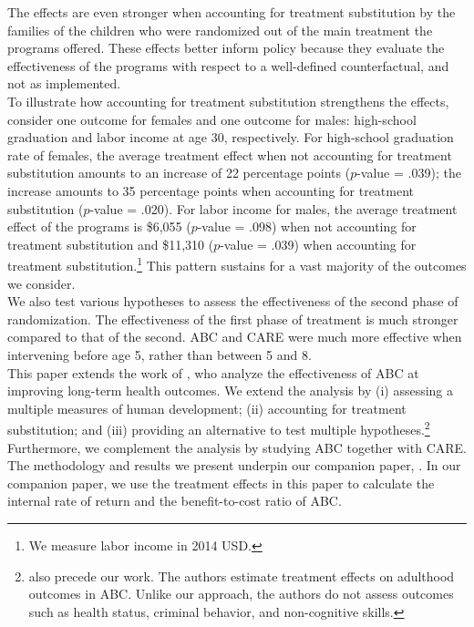 \noindent The effects are even stronger when accounting for treatment substitution by the families of the children who were randomized out of the main treatment  the programs offered. These effects better inform policy because they evaluate the effectiveness of the programs with respect to a well-defined counterfactual, and not as implemented.\\ 

\noindent To illustrate how accounting for treatment substitution strengthens the effects, consider one outcome for females and one outcome for males: high-school graduation and labor income at age 30, respectively. For high-school graduation rate of females, the average treatment effect when not accounting for treatment substitution amounts to an increase of 22 percentage points ($p$-value = .039); the increase amounts to 35 percentage points when accounting for treatment substitution ($p$-value = .020). For labor income for males, the average treatment effect of the programs is \$6,055 ($p$-value = .098) when not accounting for treatment substitution and \$11,310 ($p$-value = .039) when accounting for treatment substitution.\footnote{We measure labor income in 2014 USD.} This pattern sustains for a vast majority of the outcomes we consider.\\

\noindent We also test various hypotheses to assess the effectiveness of the second phase of randomization. The effectiveness of the first phase of treatment is much stronger compared to that of the second. ABC and CARE were much more effective when intervening before age 5, rather than between 5 and 8.\\

\noindent This paper extends the work of \citet{Campbell_Conti_etal_2014_EarlyChildhoodInvestments}, who analyze the effectiveness of ABC at improving long-term health outcomes. We extend the analysis by (i) assessing a multiple measures of human development; (ii) accounting for treatment substitution; and (iii) providing an alternative to test multiple hypotheses.\footnote{\cite{Campbell_Pungello_etal_2012_DP} also precede our work. The authors estimate treatment effects on adulthood outcomes in ABC. Unlike our approach, the authors do not assess outcomes such as health status, criminal behavior, and non-cognitive skills.} Furthermore, we complement the analysis by studying ABC together with CARE. The methodology and results we present underpin our companion paper, \citet{Elango_et_al_2015_ABC_unpublished}. In our companion paper, we use the treatment effects in this paper to calculate the internal rate of return and the benefit-to-cost ratio of ABC.\\

